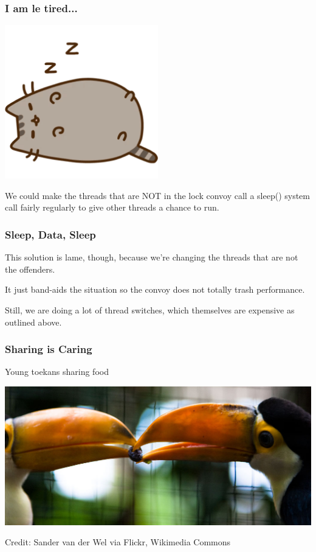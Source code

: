 \begin{frame}
\frametitle{I am le tired...}

\begin{center}
	\includegraphics[width=0.5\textwidth]{images/pusheen-sleep.png}
\end{center}

We could make the threads that are NOT in the lock convoy call a sleep() system call fairly regularly to give other threads a chance to run. 


\end{frame}


\begin{frame}
\frametitle{Sleep, Data, Sleep}

This solution is lame, though, because we're changing the threads that are not the offenders.

It just band-aids the situation so the convoy does not totally trash performance. 

Still, we are doing a lot of thread switches, which themselves are expensive as outlined above.

\end{frame}

\begin{frame}
\frametitle{Sharing is Caring}

\begin{center}
Young toekans sharing food

\includegraphics[width=\textwidth]{images/L08-sharing.jpg}

Credit: Sander van der Wel via Flickr, Wikimedia Commons
\end{center}

\end{frame}

